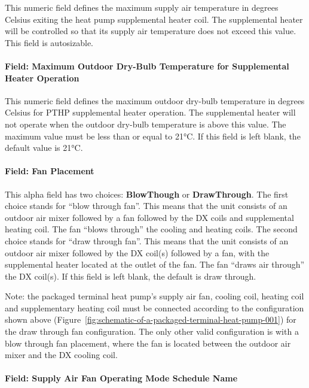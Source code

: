 This numeric field defines the maximum supply air temperature in degrees Celsius exiting the heat pump supplemental heater coil. The supplemental heater will be controlled so that its supply air temperature does not exceed this value. This field is autosizable.

\paragraph{Field: Maximum Outdoor Dry-Bulb Temperature for Supplemental Heater Operation}\label{field-maximum-outdoor-dry-bulb-temperature-for-supplemental-heater-operation-000}

This numeric field defines the maximum outdoor dry-bulb temperature in degrees Celsius for PTHP supplemental heater operation. The supplemental heater will not operate when the outdoor dry-bulb temperature is above this value. The maximum value must be less than or equal to 21°C. If this field is left blank, the default value is 21°C.

\paragraph{Field: Fan Placement}\label{field-fan-placement-4-000}

This alpha field has two choices: \textbf{BlowThough} or \textbf{DrawThrough}. The first choice stands for ``blow through fan''. This means that the unit consists of an outdoor air mixer followed by a fan followed by the DX coils and supplemental heating coil. The fan ``blows through'' the cooling and heating coils. The second choice stands for ``draw through fan''. This means that the unit consists of an outdoor air mixer followed by the DX coil(s) followed by a fan, with the supplemental heater located at the outlet of the fan. The fan ``draws air through'' the DX coil(s). If this field is left blank, the default is draw through.

Note: the packaged terminal heat pump's supply air fan, cooling coil, heating coil and supplementary heating coil must be connected according to the configuration shown above (Figure~\ref{fig:schematic-of-a-packaged-terminal-heat-pump-001}) for the draw through fan configuration. The only other valid configuration is with a blow through fan placement, where the fan is located between the outdoor air mixer and the DX cooling coil.

\paragraph{Field: Supply Air Fan Operating Mode Schedule Name}\label{field-supply-air-fan-operating-mode-schedule-name-5}

